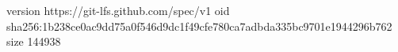 version https://git-lfs.github.com/spec/v1
oid sha256:1b238ce0ac9dd75a0f546d9dc1f49cfe780ca7adbda335bc9701e1944296b762
size 144938
